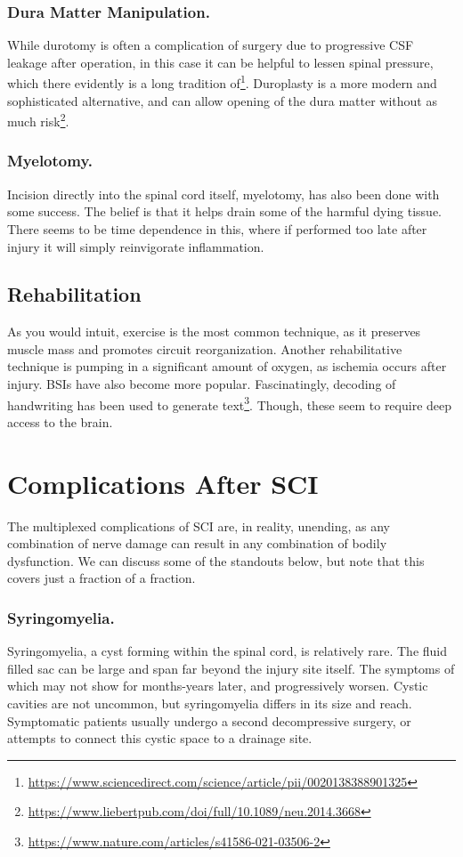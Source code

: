 \documentclass[12pt]{report}
\begin{document}
 \subsubsection{Dura Matter Manipulation.}
 While durotomy is often a complication of surgery due to progressive CSF leakage after operation, in this case it can be helpful to lessen spinal pressure, which there evidently is a long tradition of\footnote{\url{https://www.sciencedirect.com/science/article/pii/0020138388901325}}. Duroplasty is a more modern and sophisticated alternative, and can allow opening of the dura matter without as much risk\footnote{\url{https://www.liebertpub.com/doi/full/10.1089/neu.2014.3668}}.

\subsubsection{Myelotomy.}
Incision directly into the spinal cord itself, myelotomy, has also been done with some success. The belief is that it helps drain some of the harmful dying tissue. There seems to be time dependence in this, where if performed too late after injury it will simply reinvigorate inflammation. 

\subsection{Rehabilitation}
As you would intuit, exercise is the most common technique, as it preserves muscle mass and promotes circuit reorganization. Another rehabilitative technique is pumping in a significant amount of oxygen, as ischemia occurs after injury. BSIs have also become more popular. Fascinatingly, decoding of handwriting has been used to generate text\footnote{\url{https://www.nature.com/articles/s41586-021-03506-2}}. Though, these seem to require deep access to the brain. 


\section{Complications After SCI}

The multiplexed complications of SCI are, in reality, unending, as any combination of nerve damage can result in any combination of bodily dysfunction. We can discuss some of the standouts below, but note that this covers just a fraction of a fraction. 

\subsubsection{Syringomyelia.}
Syringomyelia, a cyst forming within the spinal cord, is relatively rare. The fluid filled sac can be large and span far beyond the injury site itself. The symptoms of which may not show for months-years later, and progressively worsen. Cystic cavities are not uncommon, but syringomyelia differs in its size and reach. Symptomatic patients usually undergo a second decompressive surgery, or attempts to connect this cystic space to a drainage site. 
\end{document}
